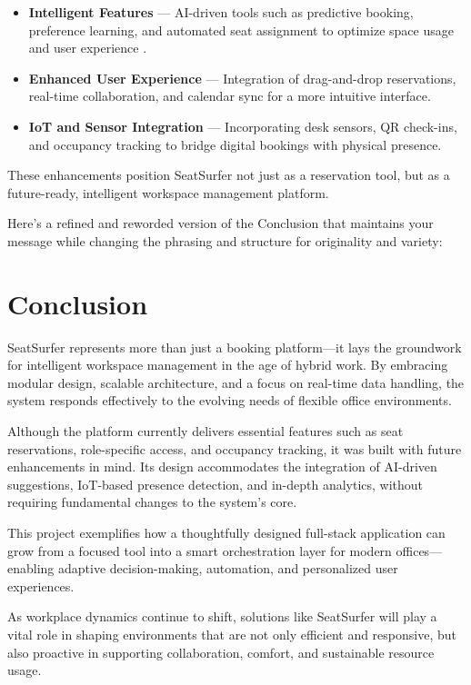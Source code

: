 \documentclass[12pt,a4paper]{report} %
\begin{document}
\begin{itemize}
    \item \textbf{Intelligent Features} — AI-driven tools such as predictive booking, preference learning, and automated seat assignment to optimize space usage and user experience \cite{nguyen2023predictive}.
    \item \textbf{Enhanced User Experience} — Integration of drag-and-drop reservations, real-time collaboration, and calendar sync for a more intuitive interface.
    \item \textbf{IoT and Sensor Integration} — Incorporating desk sensors, QR check-ins, and occupancy tracking to bridge digital bookings with physical presence.
\end{itemize}

These enhancements position SeatSurfer not just as a reservation tool, but as a future-ready, intelligent workspace management platform.

Here's a refined and reworded version of the Conclusion that maintains your message while changing the phrasing and structure for originality and variety:

\section*{Conclusion}

SeatSurfer represents more than just a booking platform—it lays the groundwork for intelligent workspace management in the age of hybrid work. By embracing modular design, scalable architecture, and a focus on real-time data handling, the system responds effectively to the evolving needs of flexible office environments.

Although the platform currently delivers essential features such as seat reservations, role-specific access, and occupancy tracking, it was built with future enhancements in mind. Its design accommodates the integration of AI-driven suggestions, IoT-based presence detection, and in-depth analytics, without requiring fundamental changes to the system’s core.

This project exemplifies how a thoughtfully designed full-stack application can grow from a focused tool into a smart orchestration layer for modern offices—enabling adaptive decision-making, automation, and personalized user experiences.

As workplace dynamics continue to shift, solutions like SeatSurfer will play a vital role in shaping environments that are not only efficient and responsive, but also proactive in supporting collaboration, comfort, and sustainable resource usage.
\end{document}
